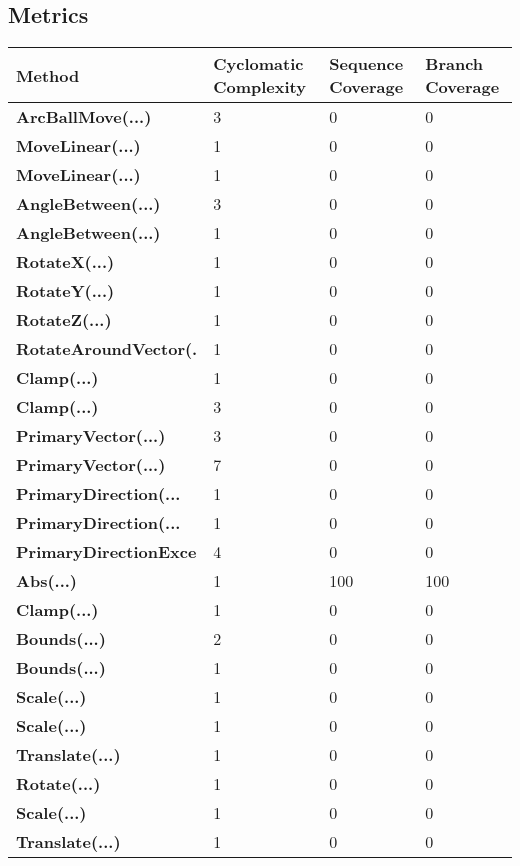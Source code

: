\documentclass[a4paper,10pt]{article}
\begin{document}
\subsection{Metrics}
\begin{longtable}[l]{|l|l|l|l|}
\hline
\textbf{Method} & \textbf{Cyclomatic Complexity} & \textbf{Sequence Coverage} & \textbf{Branch Coverage}\\
\hline
\textbf{ArcBallMove(...)} & 3 & 0 & 0\\
\hline
\textbf{MoveLinear(...)} & 1 & 0 & 0\\
\hline
\textbf{MoveLinear(...)} & 1 & 0 & 0\\
\hline
\textbf{AngleBetween(...)} & 3 & 0 & 0\\
\hline
\textbf{AngleBetween(...)} & 1 & 0 & 0\\
\hline
\textbf{RotateX(...)} & 1 & 0 & 0\\
\hline
\textbf{RotateY(...)} & 1 & 0 & 0\\
\hline
\textbf{RotateZ(...)} & 1 & 0 & 0\\
\hline
\textbf{RotateAroundVector(.} & 1 & 0 & 0\\
\hline
\textbf{Clamp(...)} & 1 & 0 & 0\\
\hline
\textbf{Clamp(...)} & 3 & 0 & 0\\
\hline
\textbf{PrimaryVector(...)} & 3 & 0 & 0\\
\hline
\textbf{PrimaryVector(...)} & 7 & 0 & 0\\
\hline
\textbf{PrimaryDirection(...} & 1 & 0 & 0\\
\hline
\textbf{PrimaryDirection(...} & 1 & 0 & 0\\
\hline
\textbf{PrimaryDirectionExce} & 4 & 0 & 0\\
\hline
\textbf{Abs(...)} & 1 & 100 & 100\\
\hline
\textbf{Clamp(...)} & 1 & 0 & 0\\
\hline
\textbf{Bounds(...)} & 2 & 0 & 0\\
\hline
\textbf{Bounds(...)} & 1 & 0 & 0\\
\hline
\textbf{Scale(...)} & 1 & 0 & 0\\
\hline
\textbf{Scale(...)} & 1 & 0 & 0\\
\hline
\textbf{Translate(...)} & 1 & 0 & 0\\
\hline
\textbf{Rotate(...)} & 1 & 0 & 0\\
\hline
\textbf{Scale(...)} & 1 & 0 & 0\\
\hline
\textbf{Translate(...)} & 1 & 0 & 0\\

\end{longtable}
\end{document}
